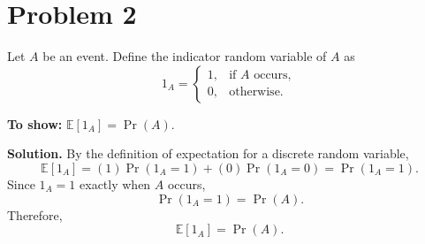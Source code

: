 \section*{Problem 2}

Let $A$ be an event. Define the indicator random variable of $A$ as
\[
1_A =
\begin{cases}
1, & \text{if } A \text{ occurs},\\
0, & \text{otherwise.}
\end{cases}
\]

\textbf{To show:} $\mathbb{E}[1_A] = \Pr(A)$.

\textbf{Solution.}
By the definition of expectation for a discrete random variable,
\[
\mathbb{E}[1_A] = (1)\Pr(1_A = 1) + (0)\Pr(1_A = 0) = \Pr(1_A = 1).
\]
Since $1_A = 1$ exactly when $A$ occurs,
\[
\Pr(1_A = 1) = \Pr(A).
\]
Therefore,
\[
\boxed{\mathbb{E}[1_A] = \Pr(A)}.
\]
